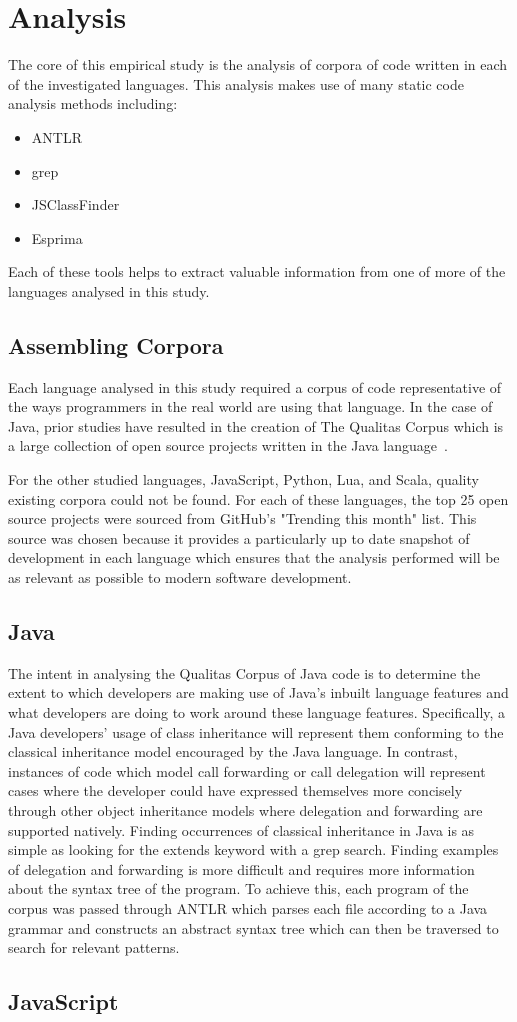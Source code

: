 \chapter{Analysis}\label{C:analysis} 
The core of this empirical study is the analysis of corpora of code written in each of the investigated languages. This analysis makes use of many static code analysis methods including:
\begin{itemize}
	\item ANTLR
	\item grep
	\item JSClassFinder
	\item Esprima
\end{itemize}
Each of these tools helps to extract valuable information from one of more of the languages analysed in this study.

\section{Assembling Corpora}
Each language analysed in this study required a corpus of code representative of the ways programmers in the real world are using that language. In the case of Java, prior studies have resulted in the creation of The Qualitas Corpus which is a large collection of open source projects written in the Java language~\cite{QualitasCorpus}. \newline

For the other studied languages, JavaScript, Python, Lua, and Scala, quality existing corpora could not be found. For each of these languages, the top 25 open source projects were sourced from GitHub's "Trending this month" list. This source was chosen because it provides a particularly up to date snapshot of development in each language which ensures that the analysis performed will be as relevant as possible to modern software development.

\section{Java}
The intent in analysing the Qualitas Corpus of Java code is to determine the extent to which developers are making use of Java's inbuilt language features and what developers are doing to work around these language features. Specifically, a Java developers' usage of class inheritance will represent them conforming to the classical inheritance model encouraged by the Java language. In contrast, instances of code which model call forwarding or call delegation will represent cases where the developer could have expressed themselves more concisely through other object inheritance models where delegation and forwarding are supported natively. \newline
Finding occurrences of classical inheritance in Java is as simple as looking for the extends keyword with a grep search. Finding examples of delegation and forwarding is more difficult and requires more information about the syntax tree of the program. To achieve this, each program of the corpus was passed through ANTLR which parses each file according to a Java grammar and constructs an abstract syntax tree which can then be traversed to search for relevant patterns.

\section{JavaScript}
